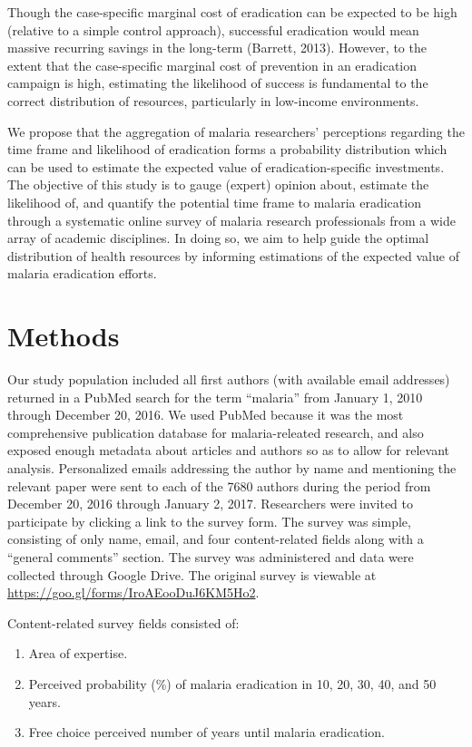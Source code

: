 \documentclass[]{article}
\providecommand{\tightlist}{%
  \setlength{\itemsep}{0pt}\setlength{\parskip}{0pt}}
\begin{document}
Though the case-specific marginal cost of eradication can be expected to
be high (relative to a simple control approach), successful eradication
would mean massive recurring savings in the long-term (Barrett, 2013).
However, to the extent that the case-specific marginal cost of
prevention in an eradication campaign is high, estimating the likelihood
of success is fundamental to the correct distribution of resources,
particularly in low-income environments.

We propose that the aggregation of malaria researchers' perceptions
regarding the time frame and likelihood of eradication forms a
probability distribution which can be used to estimate the expected
value of eradication-specific investments. The objective of this study
is to gauge (expert) opinion about, estimate the likelihood of, and
quantify the potential time frame to malaria eradication through a
systematic online survey of malaria research professionals from a wide
array of academic disciplines. In doing so, we aim to help guide the
optimal distribution of health resources by informing estimations of the
expected value of malaria eradication efforts.

\section{Methods}\label{methods}

Our study population included all first authors (with available email
addresses) returned in a PubMed search for the term ``malaria'' from
January 1, 2010 through December 20, 2016. We used PubMed because it was
the most comprehensive publication database for malaria-releated
research, and also exposed enough metadata about articles and authors so
as to allow for relevant analysis. Personalized emails addressing the
author by name and mentioning the relevant paper were sent to each of
the 7680 authors during the period from December 20, 2016 through
January 2, 2017. Researchers were invited to participate by clicking a
link to the survey form. The survey was simple, consisting of only name,
email, and four content-related fields along with a ``general comments''
section. The survey was administered and data were collected through
Google Drive. The original survey is viewable at
\url{https://goo.gl/forms/IroAEooDuJ6KM5Ho2}.

Content-related survey fields consisted of:

\begin{enumerate}
\def\labelenumi{\arabic{enumi}.}
\tightlist
\item
  Area of expertise.
\item
  Perceived probability (\%) of malaria eradication in 10, 20, 30, 40,
  and 50 years.
\item
  Free choice perceived number of years until malaria eradication.
\end{enumerate}
\end{document}
